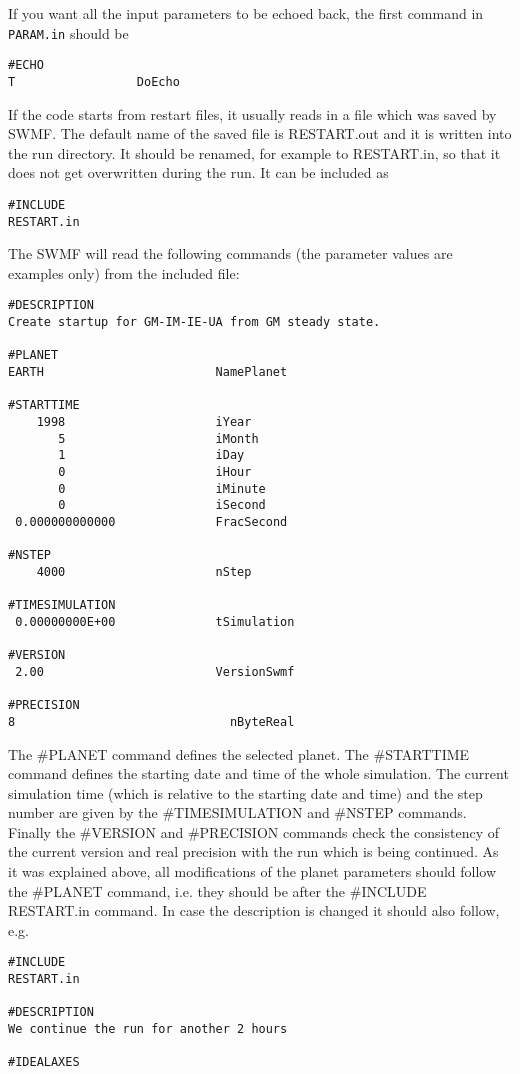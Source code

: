If you want all the input parameters to be echoed back, the first
command in {\tt PARAM.in} should be
\begin{verbatim}
#ECHO
T                 DoEcho
\end{verbatim}
If the code starts from restart files, it usually reads in a
file which was saved by SWMF. The default name of the saved
file is RESTART.out and it is written into the run directory.
It should be renamed, for example to RESTART.in, so that it
does not get overwritten during the run. It can be included as
\begin{verbatim}
#INCLUDE
RESTART.in
\end{verbatim}
The SWMF will read the following commands (the parameter values are
examples only) from the included file:
\begin{verbatim}
#DESCRIPTION
Create startup for GM-IM-IE-UA from GM steady state.

#PLANET
EARTH                        NamePlanet

#STARTTIME
    1998                     iYear
       5                     iMonth
       1                     iDay
       0                     iHour
       0                     iMinute
       0                     iSecond
 0.000000000000              FracSecond
 
#NSTEP
    4000                     nStep
 
#TIMESIMULATION
 0.00000000E+00              tSimulation
 
#VERSION
 2.00                        VersionSwmf
 
#PRECISION
8                              nByteReal
\end{verbatim}
The \#PLANET command defines the selected planet.
The \#STARTTIME command defines the starting date and time of the whole
simulation. The current simulation time (which is relative to
the starting date and time) and the step number are
given by the \#TIMESIMULATION and \#NSTEP commands. Finally
the \#VERSION and \#PRECISION commands check the consistency
of the current version and real precision with the run which
is being continued. As it was explained above, 
all modifications of the planet parameters should follow 
the \#PLANET command, i.e. they should be after 
the \#INCLUDE RESTART.in command. In case the description is
changed it should also follow, e.g.
\begin{verbatim}
#INCLUDE
RESTART.in

#DESCRIPTION
We continue the run for another 2 hours

#IDEALAXES
\end{verbatim}
